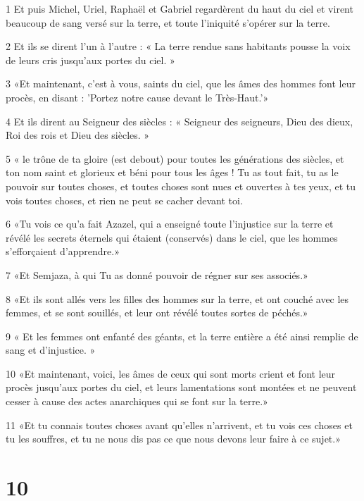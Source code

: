 \par 1 Et puis Michel, Uriel, Raphaël et Gabriel regardèrent du haut du ciel et virent beaucoup de sang versé sur la terre, et toute l'iniquité s'opérer sur la terre.
\par 2 Et ils se dirent l'un à l'autre : « La terre rendue sans habitants pousse la voix de leurs cris jusqu'aux portes du ciel. »
\par 3 «Et maintenant, c'est à vous, saints du ciel, que les âmes des hommes font leur procès, en disant : 'Portez notre cause devant le Très-Haut.'»
\par 4 Et ils dirent au Seigneur des siècles : « Seigneur des seigneurs, Dieu des dieux, Roi des rois et Dieu des siècles. »
\par 5 « le trône de ta gloire (est debout) pour toutes les générations des siècles, et ton nom saint et glorieux et béni pour tous les âges ! Tu as tout fait, tu as le pouvoir sur toutes choses, et toutes choses sont nues et ouvertes à tes yeux, et tu vois toutes choses, et rien ne peut se cacher devant toi.
\par 6 «Tu vois ce qu'a fait Azazel, qui a enseigné toute l'injustice sur la terre et révélé les secrets éternels qui étaient (conservés) dans le ciel, que les hommes s'efforçaient d'apprendre.»
\par 7 «Et Semjaza, à qui Tu as donné pouvoir de régner sur ses associés.»
\par 8 «Et ils sont allés vers les filles des hommes sur la terre, et ont couché avec les femmes, et se sont souillés, et leur ont révélé toutes sortes de péchés.»
\par 9 « Et les femmes ont enfanté des géants, et la terre entière a été ainsi remplie de sang et d'injustice. »
\par 10 «Et maintenant, voici, les âmes de ceux qui sont morts crient et font leur procès jusqu'aux portes du ciel, et leurs lamentations sont montées et ne peuvent cesser à cause des actes anarchiques qui se font sur la terre.»
\par 11 «Et tu connais toutes choses avant qu'elles n'arrivent, et tu vois ces choses et tu les souffres, et tu ne nous dis pas ce que nous devons leur faire à ce sujet.»

\chapter{10}

